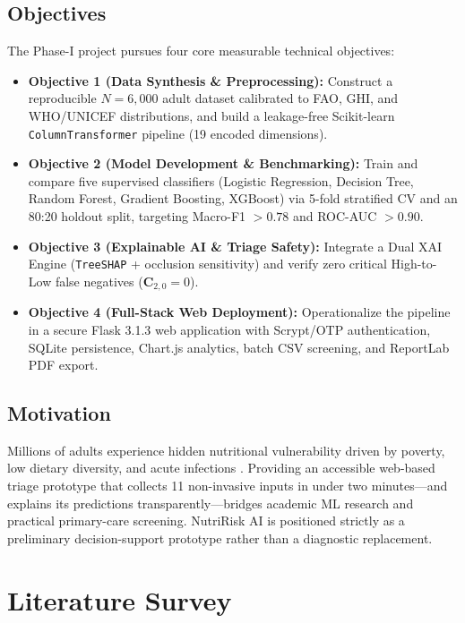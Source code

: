 \documentclass[12pt,a4paper]{report}
\begin{document}
\section{Objectives}
The Phase-I project pursues four core measurable technical objectives:
\begin{itemize}
    \item \textbf{Objective 1 (Data Synthesis \& Preprocessing):} Construct a reproducible $N = 6{,}000$ adult dataset calibrated to FAO, GHI, and WHO/UNICEF distributions, and build a leakage-free Scikit-learn \texttt{ColumnTransformer} pipeline (19 encoded dimensions).
    \item \textbf{Objective 2 (Model Development \& Benchmarking):} Train and compare five supervised classifiers (Logistic Regression, Decision Tree, Random Forest, Gradient Boosting, XGBoost) via 5-fold stratified CV and an 80:20 holdout split, targeting Macro-F1 $> 0.78$ and ROC-AUC $> 0.90$.
    \item \textbf{Objective 3 (Explainable AI \& Triage Safety):} Integrate a Dual XAI Engine (\texttt{TreeSHAP} + occlusion sensitivity) and verify zero critical High-to-Low false negatives ($\mathbf{C}_{2,0} = 0$).
    \item \textbf{Objective 4 (Full-Stack Web Deployment):} Operationalize the pipeline in a secure Flask 3.1.3 web application with Scrypt/OTP authentication, SQLite persistence, Chart.js analytics, batch CSV screening, and ReportLab PDF export.
\end{itemize}

\section{Motivation}
Millions of adults experience hidden nutritional vulnerability driven by poverty, low dietary diversity, and acute infections \cite{fao2023sofi}. Providing an accessible web-based triage prototype that collects 11 non-invasive inputs in under two minutes---and explains its predictions transparently---bridges academic ML research and practical primary-care screening. NutriRisk AI is positioned strictly as a preliminary decision-support prototype rather than a diagnostic replacement.

\chapter{Literature Survey}
\end{document}
